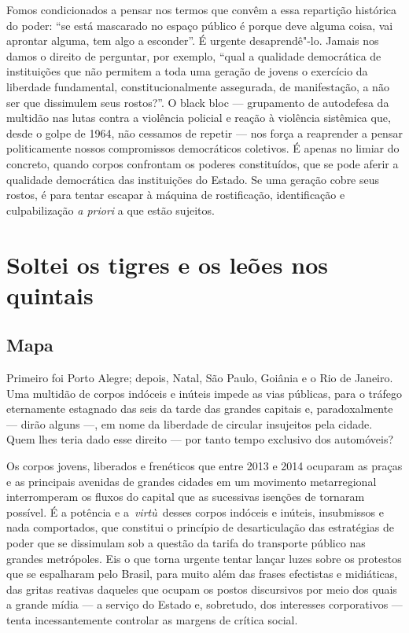 Fomos condicionados a pensar nos termos que convêm a essa repartição
histórica do poder: ``se está mascarado no espaço público é porque deve
alguma coisa, vai aprontar alguma, tem algo a esconder''. É urgente
desaprendê"-lo. Jamais nos damos o direito de perguntar, por exemplo,
``qual a qualidade democrática de instituições que não permitem a toda
uma geração de jovens o exercício da liberdade fundamental,
constitucionalmente assegurada, de manifestação, a não ser que
dissimulem seus rostos?''. O black bloc --- grupamento de autodefesa da
multidão nas lutas contra a violência policial e reação à violência
sistêmica que, desde o golpe de 1964, não cessamos de repetir --- nos
força a reaprender a pensar politicamente nossos compromissos
democráticos coletivos. É apenas no limiar do concreto, quando corpos
confrontam os poderes constituídos, que se pode aferir a qualidade
democrática das instituições do Estado. Se uma geração cobre seus
rostos, é para tentar escapar à máquina de rostificação, identificação e
culpabilização \emph{a priori} a que estão sujeitos.

\section{Soltei os tigres e os leões nos quintais}


\subsection{Mapa}

Primeiro foi Porto Alegre; depois, Natal, São
Paulo, Goiânia e o Rio de Janeiro. Uma multidão de corpos indóceis e
inúteis impede as vias públicas, para o tráfego eternamente estagnado
das seis da tarde das grandes capitais e, paradoxalmente --- dirão alguns
---, em nome da liberdade de circular insujeitos pela cidade. Quem lhes
teria dado esse direito --- por tanto tempo exclusivo dos automóveis?

Os corpos jovens, liberados e frenéticos que entre 2013 e 2014 ocuparam
as praças e as principais avenidas de grandes cidades em um movimento
metarregional interromperam os fluxos do capital que as sucessivas
isenções de  tornaram possível. É a potência e a~\emph{virtù~}desses
corpos indóceis e inúteis, insubmissos e nada comportados, que constitui
o princípio de desarticulação das estratégias de poder que se dissimulam
sob a questão da tarifa do transporte público nas grandes metrópoles.
Eis o que torna urgente tentar lançar luzes sobre os protestos que se
espalharam pelo Brasil, para muito além das frases efectistas e
midiáticas, das gritas reativas daqueles que ocupam os postos
discursivos por meio dos quais a grande mídia --- a serviço do Estado e,
sobretudo, dos interesses corporativos --- tenta incessantemente controlar
as margens de crítica social.

